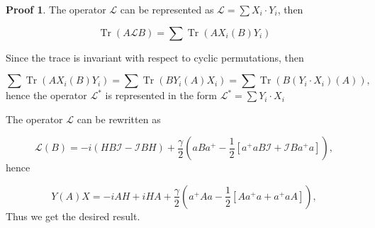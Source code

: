 \documentclass[12pt]{article}
\theoremstyle{definition}
\newtheorem*{demo}{Proof}
\newcommand\Tr{\operatorname{Tr}}
\def\ga {\gamma}
\begin{document}
	\begin{demo}
		The operator $\mathcal{L}$ can be represented as $\mathcal{L} = \sum X_i\cdot Y_i$, then 
		
		\begin{equation*}
			\Tr(A\mathcal{L}B) = \sum\Tr(AX_i(B)Y_i)
		\end{equation*}
		
		Since the trace is invariant with respect to cyclic permutations, then 	
		
		\begin{equation*}
			\sum\Tr(AX_i(B) Y_i) = \sum\Tr(B Y_i(A)X_i) = \sum\Tr(B(Y_i\cdot X_i)(A)),
		\end{equation*}
		hence the operator $\mathcal{L}^*$ is represented in the form $\mathcal{L}^* = \sum Y_i \cdot X_i$
		
		
		The operator $\mathcal{L}$ can be rewritten as
		
		\begin{equation*}
			\mathcal{L}(B) = -i(HB\mathcal{I} - \mathcal{I}B H) + \dfrac{\ga}{2}(aB a^+ - \dfrac{1}{2}[a^+aB\mathcal{I} + \mathcal{I}B a^+a]),
		\end{equation*}
		hence
		
		\begin{equation*}
			Y(A)X = -iAH + iHA + \dfrac{\ga}{2}(a^+Aa - \dfrac{1}{2}[Aa^+a + a^+aA]),	
		\end{equation*}
		Thus we get the desired result.
	\end{demo}
	
\end{document}
